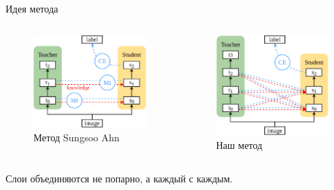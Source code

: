 \documentclass{beamer}
\begin{document}
\begin{frame}{Идея метода}

    \begin{columns}[c]
        \begin{figure}
            \includegraphics[width=1.0\textwidth]{ahn_diagram.pdf}
            \caption*{Метод Sungsoo Ahn \footnotemark}
        \end{figure}

        \begin{figure}
            \includegraphics[width=1.0\textwidth]{our_diagram.pdf}
            \caption*{Наш метод}
        \end{figure}
    \end{columns}

    Слои объединяются не попарно, а каждый с каждым.

\end{frame}
\end{document}
